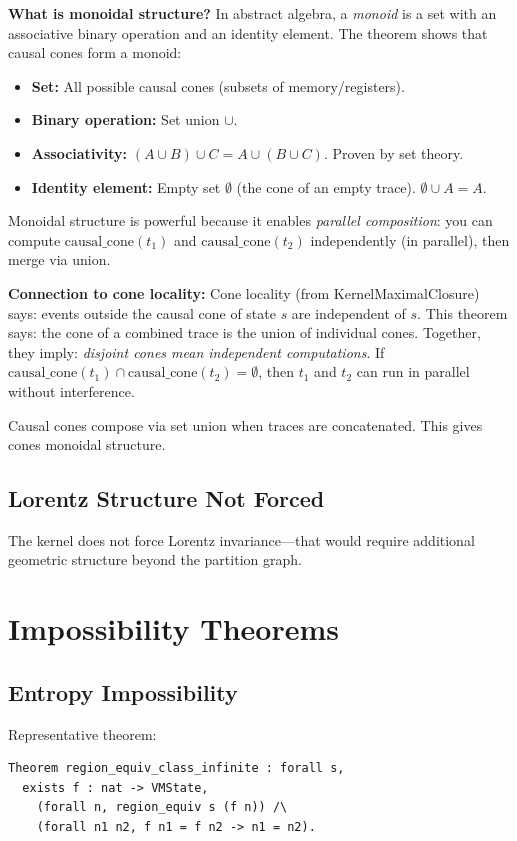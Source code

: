 \textbf{What is monoidal structure?} In abstract algebra, a \textit{monoid} is a set with an associative binary operation and an identity element. The theorem shows that causal cones form a monoid:
\begin{itemize}
    \item \textbf{Set:} All possible causal cones (subsets of memory/registers).
    \item \textbf{Binary operation:} Set union $\cup$.
    \item \textbf{Associativity:} $(A \cup B) \cup C = A \cup (B \cup C)$. Proven by set theory.
    \item \textbf{Identity element:} Empty set $\emptyset$ (the cone of an empty trace). $\emptyset \cup A = A$.
\end{itemize}
Monoidal structure is powerful because it enables \textit{parallel composition}: you can compute $\text{causal\_cone}(t_1)$ and $\text{causal\_cone}(t_2)$ independently (in parallel), then merge via union.

\textbf{Connection to cone locality:} Cone locality (from KernelMaximalClosure) says: events outside the causal cone of state $s$ are independent of $s$. This theorem says: the cone of a combined trace is the union of individual cones. Together, they imply: \textit{disjoint cones mean independent computations}. If $\text{causal\_cone}(t_1) \cap \text{causal\_cone}(t_2) = \emptyset$, then $t_1$ and $t_2$ can run in parallel without interference.


Causal cones compose via set union when traces are concatenated. This gives cones monoidal structure.

\subsection{Lorentz Structure Not Forced}

The kernel does not force Lorentz invariance---that would require additional geometric structure beyond the partition graph.

\section{Impossibility Theorems}

\subsection{Entropy Impossibility}

Representative theorem:
\begin{lstlisting}
Theorem region_equiv_class_infinite : forall s,
  exists f : nat -> VMState,
    (forall n, region_equiv s (f n)) /\
    (forall n1 n2, f n1 = f n2 -> n1 = n2).
\end{lstlisting}

